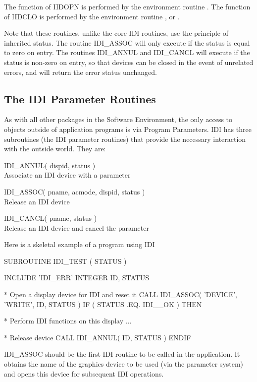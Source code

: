 \documentclass[11pt,nolof]{starlink}
\newenvironment{routinelist}{\begin{list}{}{\setlength{\leftmargin}{2cm}
                             \setlength{\parsep}{\smallskipamount}}}{\end{list}}
\providecommand{\lnoteroutine}[2]{\item\hspace{-1cm}#1#2\\}
\begin{document}
The function of IIDOPN is performed by the environment routine
.
The function of IIDCLO is performed by the environment routine
,
or .

Note that these routines, unlike the core IDI routines, use the principle
of inherited status. The routine IDI\_ASSOC will only execute if the
status is equal to zero on entry. The routines IDI\_ANNUL and IDI\_CANCL
will execute if the status is non-zero on entry, so that devices can be
closed in the event of unrelated errors, and will return the error
status unchanged.

\subsection{The IDI Parameter Routines}

As with all other packages in the Software Environment, the only access to
objects outside of application programs is via Program Parameters. IDI has
three subroutines (the IDI parameter routines) that provide the
necessary interaction with the outside world. They are:

\begin{routinelist}
\lnoteroutine{IDI\_ANNUL}{( dispid, status )}
{Associate an IDI device with a parameter}
\lnoteroutine{IDI\_ASSOC}{( pname, acmode, dispid, status )}
{Release an IDI device}
\lnoteroutine{IDI\_CANCL}{( pname, status )}
{Release an IDI device and cancel the parameter}
\end{routinelist}

Here is a skeletal example of a program using IDI
\begin{small}
\begin{terminalv}
      SUBROUTINE IDI_TEST ( STATUS )

      INCLUDE 'IDI_ERR'
      INTEGER ID, STATUS

*   Open a display device for IDI and reset it
      CALL IDI_ASSOC( 'DEVICE', 'WRITE', ID, STATUS )
      IF ( STATUS .EQ. IDI__OK ) THEN

*   Perform IDI functions on this display
         ...

*   Release device
         CALL IDI_ANNUL( ID, STATUS )
      ENDIF
\end{terminalv}
\end{small}

IDI\_ASSOC should be the first IDI routine to be called in the application.
It obtains the name of the graphics device to be used (via the parameter
system) and opens this device for subsequent IDI operations.
\end{document}
